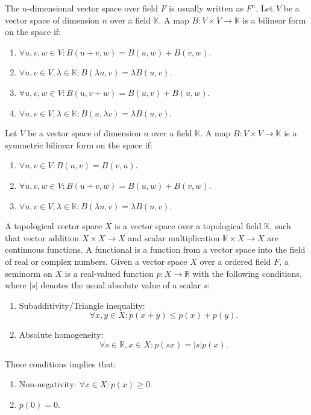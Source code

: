 \documentclass[a4paper,12pt]{report}
\begin{document}
The $n$-dimensional vector space over field $F$ is usually written as $F^n$.
Let $V$ be a vector space of dimension $n$ over a field $\mathbb{K}$. A map $B\colon V\times V\rightarrow \mathbb{K}$ is a bilinear form on the space if:
\begin{enumerate}
\item $\forall u,v,w\in V\colon B(u+v,w)=B(u,w)+B(v,w)$.
\item $\forall u,v\in V,\lambda\in \mathbb{K}\colon B(\lambda u,v)=\lambda B(u,v)$.
\item $\forall u,v,w\in V\colon B(u,v+w)=B(u,v)+B(u,w)$.
\item $\forall u,v\in V,\lambda\in \mathbb{K}\colon B(u,\lambda v)=\lambda B(u,v)$.
\end{enumerate}
Let $V$ be a vector space of dimension $n$ over a field $\mathbb{K}$. A map $B\colon V\times V\rightarrow \mathbb{K}$ is a symmetric bilinear form on the space if:
\begin{enumerate}
\item $\forall u,v\in V\colon B(u,v)=B(v,u)$.
\item $\forall u,v,w\in V\colon B(u+v,w)=B(u,w)+B(v,w)$.
\item $\forall u,v\in V,\lambda\in \mathbb{K}\colon B(\lambda u,v)=\lambda B(u,v)$.
\end{enumerate}
A topological vector space $X$ is a vector space over a topological field $\mathbb{K}$, such that vector addition $X\times X\to X$ and scalar multiplication $\mathbb{K}\times X \to X$ are continuous functions.
A functional is a function from a vector space into the field of real or complex numbers.
Given a vector space $X$ over a ordered field $F$, a seminorm on $X$ is a real-valued function $p\colon X\to\mathbb{R}$ with the following conditions, where $|s|$ denotes the usual absolute value of a scalar $s$:
\begin{enumerate}
\item Subadditivity/Triangle inequality:\[\forall x,y\in X\colon p(x+y)\leq p(x)+p(y).\]
\item Absolute homogeneity: \[\forall s\in\mathbb{R},x\in X\colon p(sx)=|s|p(x).\]
\end{enumerate}
These conditions implies that:
\begin{enumerate}
\item Non-negativity: $\forall x\in X\colon p(x)\geq 0$.
\item $p(0)=0$.
\end{enumerate}
\end{document}
